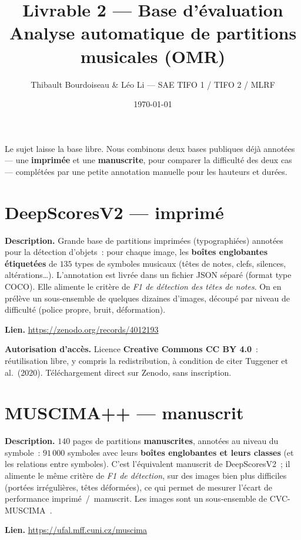 \documentclass[11pt,a4paper]{article}
\title{\vspace{-1.2cm}\textbf{Livrable 2 --- Base d'évaluation\\[2pt]
\large Analyse automatique de partitions musicales (OMR)}}
\author{\normalsize Thibault Bourdoiseau \& Léo Li --- SAE TIFO 1 / TIFO 2 / MLRF}
\date{\vspace{-8pt}\small \today}
\begin{document}
\maketitle
\vspace{-10pt}

Le sujet laisse la base libre. Nous combinons deux bases publiques déjà annotées --- une \textbf{imprimée} et
une \textbf{manuscrite}, pour comparer la difficulté des deux cas --- complétées par une petite annotation
manuelle pour les hauteurs et durées.

\section{DeepScoresV2 --- imprimé~\cite{tuggener2020}}
\textbf{Description.} Grande base de partitions imprimées (typographiées) annotées pour la détection
d'objets~: pour chaque image, les \textbf{boîtes englobantes étiquetées} de $135$ types de symboles musicaux
(têtes de notes, clefs, silences, altérations\dots). L'annotation est livrée dans un fichier JSON séparé
(format type COCO). Elle alimente le critère de \emph{F1 de détection des têtes de notes}. On en prélève un
sous-ensemble de quelques dizaines d'images, découpé par niveau de difficulté (police propre, bruit,
déformation).

\textbf{Lien.} \url{https://zenodo.org/records/4012193}

\textbf{Autorisation d'accès.} Licence \textbf{Creative Commons CC BY 4.0}~: réutilisation libre, y compris la
redistribution, à condition de citer Tuggener et al.~(2020). Téléchargement direct sur Zenodo, sans
inscription.

\section{MUSCIMA++ --- manuscrit~\cite{hajic2017,fornes2012}}
\textbf{Description.} $140$ pages de partitions \textbf{manuscrites}, annotées au niveau du symbole~:
$91\,000$ symboles avec leurs \textbf{boîtes englobantes et leurs classes} (et les relations entre symboles).
C'est l'équivalent manuscrit de DeepScoresV2~; il alimente le même critère de \emph{F1 de détection}, sur des
images bien plus difficiles (portées irrégulières, têtes déformées), ce qui permet de mesurer l'écart de
performance imprimé~/~manuscrit. Les images sont un sous-ensemble de CVC-MUSCIMA~\cite{fornes2012}.

\textbf{Lien.} \url{https://ufal.mff.cuni.cz/muscima}
\end{document}
